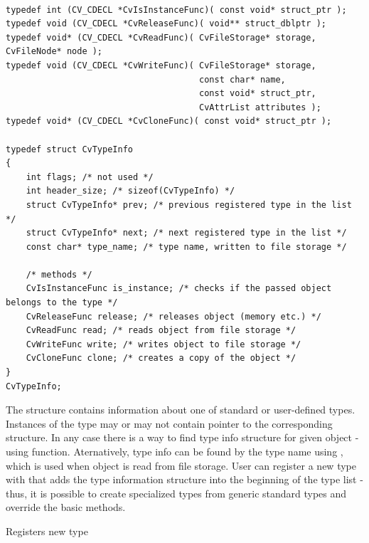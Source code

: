 \begin{lstlisting}

typedef int (CV_CDECL *CvIsInstanceFunc)( const void* struct_ptr );
typedef void (CV_CDECL *CvReleaseFunc)( void** struct_dblptr );
typedef void* (CV_CDECL *CvReadFunc)( CvFileStorage* storage, CvFileNode* node );
typedef void (CV_CDECL *CvWriteFunc)( CvFileStorage* storage,
                                      const char* name,
                                      const void* struct_ptr,
                                      CvAttrList attributes );
typedef void* (CV_CDECL *CvCloneFunc)( const void* struct_ptr );

typedef struct CvTypeInfo
{
    int flags; /* not used */
    int header_size; /* sizeof(CvTypeInfo) */
    struct CvTypeInfo* prev; /* previous registered type in the list */
    struct CvTypeInfo* next; /* next registered type in the list */
    const char* type_name; /* type name, written to file storage */

    /* methods */
    CvIsInstanceFunc is_instance; /* checks if the passed object belongs to the type */
    CvReleaseFunc release; /* releases object (memory etc.) */
    CvReadFunc read; /* reads object from file storage */
    CvWriteFunc write; /* writes object to file storage */
    CvCloneFunc clone; /* creates a copy of the object */
}
CvTypeInfo;

\end{lstlisting}

The structure  contains information about one of
standard or user-defined types. Instances of the type may or may not
contain pointer to the corresponding  structure. In
any case there is a way to find type info structure for given object -
using  function. Aternatively, type info can be found by
the type name using , which is used when object is read
from file storage. User can register a new type with 
that adds the type information structure into the beginning of the type
list - thus, it is possible to create specialized types from generic
standard types and override the basic methods.

\label{RegisterType}

Registers new type


\begin{description}
\end{description}

